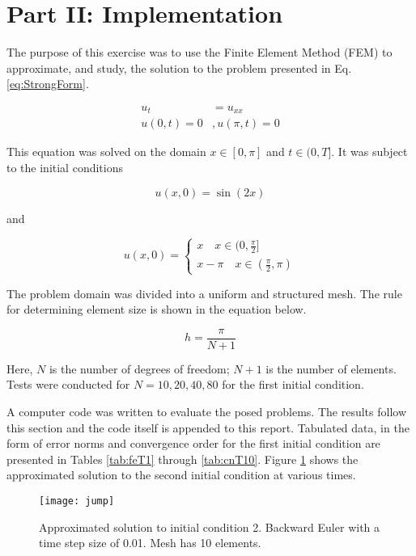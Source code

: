 \documentclass[a4paper, 12pt]{article}
\title{}
\begin{document}
\section*{Part II: Implementation} \label{sec:intro}
The purpose of this exercise was to use the Finite Element Method (FEM) 
to approximate, and study, the solution to the problem presented in 
Eq. \ref{eq:StrongForm}.

\begin{align}
u_t &= u_{xx}  \label{eq:StrongForm} \\
u(0,t) = 0 &, u(\pi, t) = 0 
\end{align}

\noindent
This equation was solved on the domain $x\in[0,\pi]$ and $t\in(0, T]$.
It was subject to the initial conditions

\begin{equation}
u(x,0) = \sin(2x)
\end{equation}

\noindent
and

\[
  u(x, 0) = \begin{cases}
    x \quad x \in (0, \frac{\pi}{2}] \\
    x - \pi \quad x \in( \frac{\pi}{2}, \pi)
  \end{cases}
\]

\noindent
The problem domain was divided into a uniform and structured mesh.
The rule for determining element size is shown in the equation below.

\begin{equation}
  h =  \frac{ \pi}{ N+1}
\end{equation}

\noindent
Here, $N$ is the number of degrees of freedom; $N+1$ is the number of elements.
Tests were conducted for $N=10, 20, 40, 80$ for the first initial condition. 

A computer code was written to evaluate the posed problems. 
The results follow this section and the code itself 
is appended to this report.
Tabulated data, in the form of error norms and convergence order 
for the first initial condition
are presented in Tables \ref{tab:feT1} through \ref{tab:cnT10}.
Figure \ref{fig:jump} shows the approximated solution
to the second initial condition at various times.

\begin{figure}[H]
  \centering
  \texttt{[image: jump]}
  \caption{ Approximated solution to initial condition 2.
            Backward Euler with a time step size of 0.01.
            Mesh has 10 elements.}
  \label{fig:jump}
\end{figure}
\end{document}

